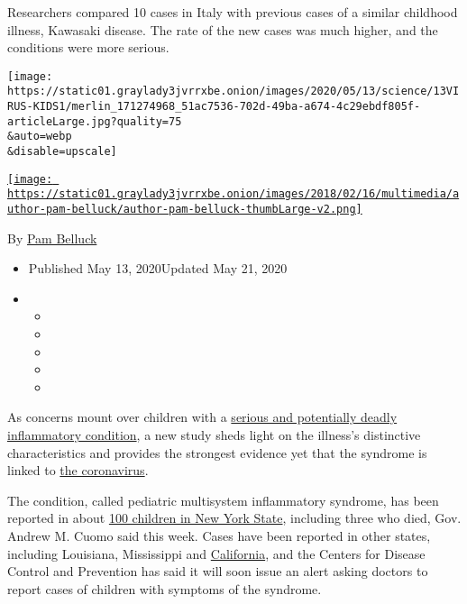 Researchers compared 10 cases in Italy with previous cases of a similar
childhood illness, Kawasaki disease. The rate of the new cases was much
higher, and the conditions were more serious.

\texttt{[image: https://static01.graylady3jvrrxbe.onion/images/2020/05/13/science/13VIRUS-KIDS1/merlin\_171274968\_51ac7536-702d-49ba-a674-4c29ebdf805f-articleLarge.jpg?quality=75\\\&auto=webp\\\&disable=upscale]}

\href{https://www.nytimes3xbfgragh.onion/by/pam-belluck}{\texttt{[image: https://static01.graylady3jvrrxbe.onion/images/2018/02/16/multimedia/author-pam-belluck/author-pam-belluck-thumbLarge-v2.png]}}

By \href{https://www.nytimes3xbfgragh.onion/by/pam-belluck}{Pam Belluck}

\begin{itemize}
\item
  Published May 13, 2020Updated May 21, 2020
\item
  \begin{itemize}
  \item
  \item
  \item
  \item
  \item
  \end{itemize}
\end{itemize}

As concerns mount over children with a
\href{https://www.nytimes3xbfgragh.onion/article/kawasaki-disease-coronavirus-children.html}{serious
and potentially deadly inflammatory condition}, a new study sheds light
on the illness's distinctive characteristics and provides the strongest
evidence yet that the syndrome is linked to
\href{https://www.nytimes3xbfgragh.onion/2020/05/21/podcasts/the-daily/coronavirus-children-sick.html}{the
coronavirus}.

The condition, called pediatric multisystem inflammatory syndrome, has
been reported in about
\href{https://www.nytimes3xbfgragh.onion/2020/05/12/nyregion/coronavirus-new-york-update.html}{100
children in New York State}, including three who died, Gov. Andrew M.
Cuomo said this week. Cases have been reported in other states,
including Louisiana, Mississippi and
\href{https://hosppeds.aappublications.org/content/hosppeds/early/2020/04/06/hpeds.2020-0123.full.pdf}{California},
and the Centers for Disease Control and Prevention has said it will soon
issue an alert asking doctors to report cases of children with symptoms
of the syndrome.

